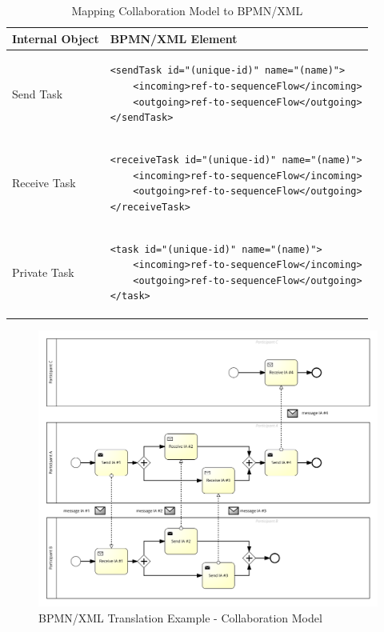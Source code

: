 \begin{table}[H]
\centering
\begin{tabular}{l|l}
\multicolumn{1}{c|}{\textbf{Internal Object}} & \multicolumn{1}{l}{\textbf{BPMN/XML Element}}     \\ \hline
Send Task & 
\begin{lstlisting}
<sendTask id="(unique-id)" name="(name)">
    <incoming>ref-to-sequenceFlow</incoming>
    <outgoing>ref-to-sequenceFlow</outgoing>
</sendTask>
\end{lstlisting} \\ \hline
Receive Task & 
\begin{lstlisting}
<receiveTask id="(unique-id)" name="(name)">
    <incoming>ref-to-sequenceFlow</incoming>
    <outgoing>ref-to-sequenceFlow</outgoing>
</receiveTask>
\end{lstlisting} \\ \hline
Private Task & 
\begin{lstlisting}
<task id="(unique-id)" name="(name)">
    <incoming>ref-to-sequenceFlow</incoming>
    <outgoing>ref-to-sequenceFlow</outgoing>
</task>
\end{lstlisting} \\ \hline
\end{tabular}
\caption{Mapping Collaboration Model to BPMN/XML}
\label{tbl:collab2bpmn}
\end{table}

\begin{figure}[H]
\includegraphics[width=1\textwidth]{src/images/collab2bpm.png}
\caption{BPMN/XML Translation Example - Collaboration Model}
\label{fig:collab2bpmn}
\end{figure}

